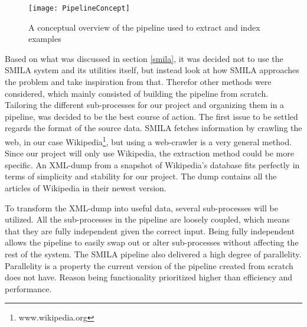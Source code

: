 \begin{figure}[h]
\caption{A conceptual overview of the pipeline used to extract and index examples}
\texttt{[image: PipelineConcept]}
\end{figure}



Based on what was discussed in section \ref{smila}, it was decided not to use the SMILA system and its utilities itself, but instead look at how SMILA approaches the problem and take inspiration from that. Therefor other methods were considered, which mainly consisted of building the pipeline from scratch. Tailoring the different sub-processes for our project and organizing them in a pipeline, was decided to be the best course of action. The first issue to be settled regards the format of the source data. SMILA fetches information by crawling the web, in our case Wikipedia\footnote{www.wikipedia.org}, but using a web-crawler is a very general method. Since our project will only use Wikipedia, the extraction method could be more specific. An XML-dump from a snapshot of Wikipedia's database fits perfectly in terms of simplicity and stability for our project. The dump contains all the articles of Wikipedia in their newest version.

To transform the XML-dump into useful data, several sub-processes will be utilized. All the sub-processes in the pipeline are loosely coupled, which means that they are fully independent given the correct input. Being fully independent allows the pipeline to easily swap out or alter sub-processes without affecting the rest of the system. The SMILA pipeline also delivered a high degree of parallelity. Parallelity is a property the current version of the pipeline created from scratch does not have. Reason being functionality prioritized higher than efficiency and performance. 

